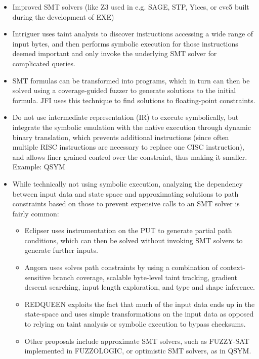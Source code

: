 \documentclass{article}
\begin{document}
\begin{multicols}{2}
\begin{itemize}
        \item Improved SMT solvers (like Z3\cite{Z3} used in e.g. SAGE\cite{SAGE}, STP\cite{STP}, Yices\cite{Yices}, or cvc5\cite{CVC5} built during the development of EXE\cite{EXE})
        \item Intriguer\cite{Intriguer} uses taint analysis to discover instructions accessing a wide range of input bytes, and then performs symbolic execution for those instructions deemed important and only invoke the underlying SMT solver for complicated queries.
        \item SMT formulas can be transformed into programs, which in turn can then be solved using a coverage-guided fuzzer to generate solutions to the initial formula. JFI\cite{JFI} uses this technique to find solutions to floating-point constraints.
        \item Do not use intermediate representation (IR) to execute symbolically, but integrate the symbolic emulation with the native execution through dynamic binary translation, which prevents additional instructions (since often multiple RISC instructions are necessary to replace one CISC instruction), and allows finer-grained control over the constraint, thus making it smaller. Example: QSYM\cite{QSYM}
        \item While technically not using symbolic execution, analyzing the dependency between input data and state space and approximating solutions to path constraints based on those to prevent expensive calls to an SMT solver is fairly common\cite{WEIZZ}:
              \begin{itemize}
                  \item Eclipser\cite{Eclipser} uses instrumentation on the PUT to generate partial path conditions, which can then be solved without invoking SMT solvers to generate further inputs.
                  \item Angora\cite{Angora} uses solves path constraints by using a combination of context-sensitive branch coverage, scalable byte-level taint tracking, gradient descent searching, input length exploration, and type and shape inference.
                  \item REDQUEEN\cite{REDQUEEN} exploits the fact that much of the input data ends up in the state-space and uses simple transformations on the input data as opposed to relying on taint analysis or symbolic execution to bypass checksums.
                  \item Other proposals include approximate SMT solvers, such as FUZZY-SAT implemented in FUZZOLOGIC\cite{FUZZOLIC}, or optimistic SMT solvers, as in QSYM\cite{QSYM}.
              \end{itemize}
    \end{itemize}


\end{multicols}
\end{document}
